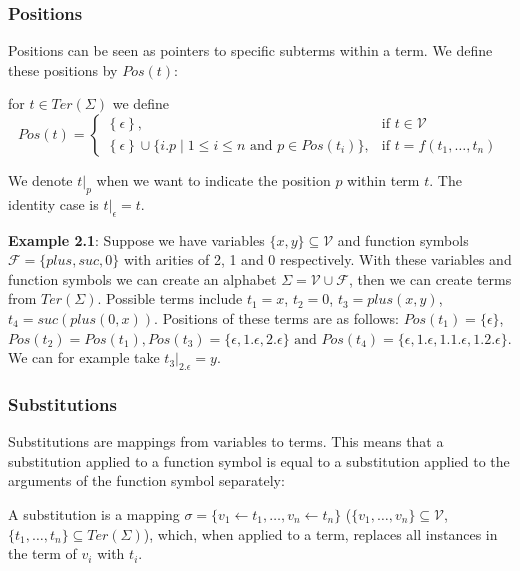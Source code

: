 \subsubsection*{Positions}
Positions can be seen as pointers to specific subterms within a term. We define these positions by $\textit{Pos}\left(t\right)$:
\begin{definition}
for $t \in \textit{Ter}\left(\Sigma\right)$ we define
$$
\textit{Pos}(t) = \left\{\begin{array}{ll}
        \left\{\epsilon\right\}, & \text{if } t \in \mathcal{V}\\
        \left\{\epsilon\right\} \cup \{i.p \mid 1 \leq i \leq n \text{ and } p  \in \textit{Pos}(t_i)\} , & \text{if } t = f(t_1, \dots, t_n)
        \end{array}\right.
$$
\end{definition}
We denote $\left.t\right|_p$ when we want to indicate the position $p$ within term $t$. The identity case is $\left.t\right|_\epsilon = t$.

\textbf{Example 2.1}: Suppose we have variables $\{ x, y \} \subseteq \mathcal{V}$ and function symbols $\mathcal{F} = \{ plus, suc, 0\}$ with arities of 2, 1 and 0 respectively. With these variables and function symbols we can create an alphabet $\Sigma = \mathcal{V} \cup \mathcal{F}$, then we can create terms from $\textit{Ter}(\Sigma)$. Possible terms include $t_1 = x$, $t_2 = 0$, $t_3 = plus(x, y)$, $t_4 = suc(plus(0, x))$. Positions of these terms are as follows: $\textit{Pos}(t_1) = \{ \epsilon \}$, $\textit{Pos}(t_2) = \textit{Pos}(t_1), \textit{Pos}(t_3) = \{ \epsilon, 1.\epsilon, 2.\epsilon \} \text{ and }\textit{Pos}(t_4) = \{ \epsilon, 1.\epsilon, 1.1.\epsilon, 1.2.\epsilon \}$. We can for example take $\left. t_3\right|_{2.\epsilon} = y$.

\subsubsection*{Substitutions}
Substitutions are mappings from variables to terms. This means that a substitution applied to a function symbol is equal to a substitution applied to the arguments of the function symbol separately:
\begin{definition}
A substitution is a mapping $\sigma = \{ v_1 \leftarrow t_1, \dots, v_n \leftarrow t_n \}$ ($\{ v_1, \dots, v_n \} \subseteq \mathcal{V}$, $\{ t_1, \dots, t_n\} \subseteq \textit{Ter}(\Sigma)$), which, when applied to a term, replaces all instances in the term of $v_i$ with $t_i$.
\end{definition}

